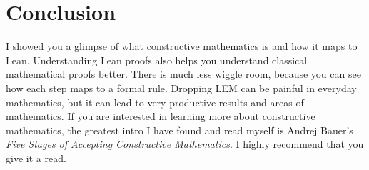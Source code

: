 \documentclass{article}
\begin{document}
\section{Conclusion}

I showed you a glimpse of what constructive mathematics is and how it maps to Lean.
Understanding Lean proofs also helps you understand classical mathematical proofs better.
There is much less wiggle room, because you can see how each step maps to a formal rule.
Dropping LEM can be painful in everyday mathematics, but it can lead to very productive results and areas of mathematics.
If you are interested in learning more about constructive mathematics, the greatest intro I have found and read myself is Andrej Bauer's \href{https://www.ams.org/journals/bull/2017-54-03/S0273-0979-2016-01556-4/S0273-0979-2016-01556-4.pdf}{\emph{Five Stages of Accepting Constructive Mathematics}}.
I highly recommend that you give it a read.
\end{document}
